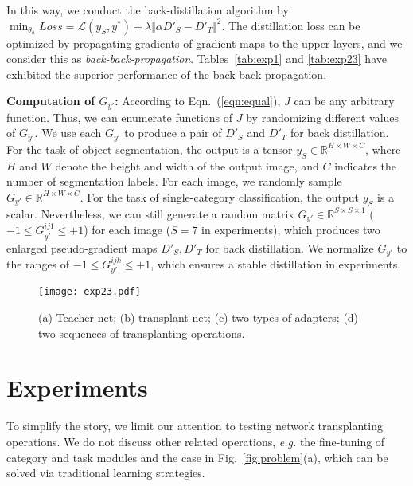 \documentclass[10pt,twocolumn,letterpaper]{article}
\begin{document}
In this way, we conduct the back-distillation algorithm by {\small$\min_{\theta_{h}}Loss\!=\!\mathcal{L}(y_{S},y^{*})\!+\!\lambda\Vert\alpha D'_{S}\!-\!D'_{T}\Vert^2$}. The distillation loss can be optimized by propagating gradients of gradient maps to the upper layers, and we consider this as \textit{back-back-propagation}\textcolor{red}{\footnotemark[1]}. Tables~\ref{tab:exp1} and \ref{tab:exp23} have exhibited the superior performance of the back-back-propagation.

\textbf{Computation of {\small$G_{y'}$}:} According to Eqn.~(\ref{eqn:equal}), $J$ can be any arbitrary function. Thus, we can enumerate functions of $J$ by randomizing different values of {\small$G_{y'}$}. We use each {\small$G_{y'}$} to produce a pair of {\small$D'_{S}$} and {\small$D'_{T}$} for back distillation. For the task of object segmentation, the output is a tensor {\small$y_{S}\in\mathbb{R}^{H\times W\times C}$}, where {\small$H$} and {\small$W$} denote the height and width of the output image, and {\small$C$} indicates the number of segmentation labels. For each image, we randomly sample {\small$G_{y'}\in\mathbb{R}^{H\times W\times C}$}. For the task of single-category classification, the output {\small$y_{S}$} is a scalar. Nevertheless, we can still generate a random matrix {\small$G_{y'}\in\mathbb{R}^{S\times S\times 1}$} ({\small$-1\leq G_{y'}^{ij1}\leq+1$}) for each image ({\small$S\!=\!7$} in experiments), which produces two enlarged pseudo-gradient maps $D'_{S},D'_{T}$ for back distillation\textcolor{red}{\footnotemark[1]}. We normalize {\small$G_{y'}$} to the ranges of {\small$-1\leq G_{y'}^{ijk}\leq+1$}, which ensures a stable distillation in experiments.

\begin{figure}
\centering
\texttt{[image: exp23.pdf]}
\vspace{2pt}
\caption{(a) Teacher net; (b) transplant net; (c) two types of adapters; (d) two sequences of transplanting operations.}
\label{fig:exp23}
\end{figure}

\section{Experiments}

To simplify the story, we limit our attention to testing network transplanting operations. We do not discuss other related operations, \emph{e.g.} the fine-tuning of category and task modules and the case in Fig.~\ref{fig:problem}(a), which can be solved via traditional learning strategies.
\end{document}

